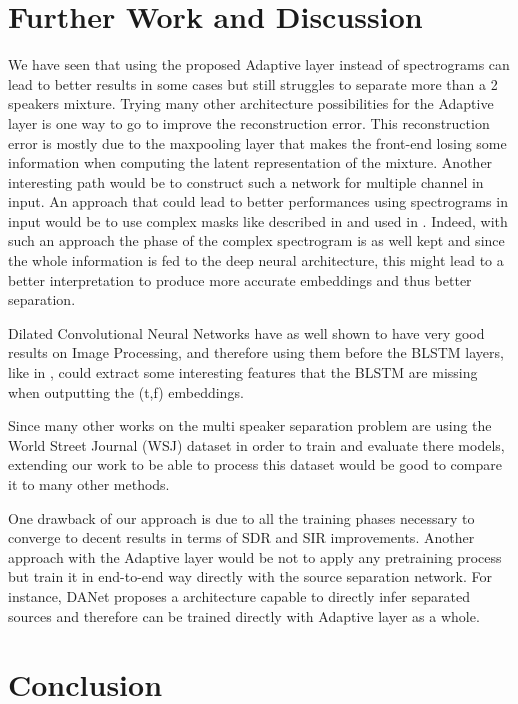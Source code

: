 \documentclass[master,final,11pt]{iscs-thesis}
\begin{document}
\chapter{Further Work and Discussion}

We have seen that using the proposed Adaptive layer instead of spectrograms can lead to better results in some cases but still struggles to separate more than a 2 speakers mixture. Trying many other architecture possibilities for the Adaptive layer is one way to go to improve the reconstruction error. This reconstruction error is mostly due to the maxpooling layer that makes the front-end losing some information when computing the latent representation of the mixture.
Another interesting path would be to construct such a network for multiple channel in input.
An approach that could lead to better performances using spectrograms in input would be to use complex masks like described in \cite{OverviewSSDL} and used in \cite{ImageSS}. Indeed, with such an approach the phase of the complex spectrogram is as well kept and since the whole information is fed to the deep neural architecture, this might lead to a better interpretation to produce more accurate embeddings and thus better separation.

Dilated Convolutional Neural Networks have as well shown to have very good results on Image Processing, and therefore using them before the BLSTM layers, like in \cite{ImageSS}, could extract some interesting features that the BLSTM are missing when outputting the (t,f) embeddings.

Since many other works on the multi speaker separation problem are using the World Street Journal (WSJ) dataset in order to train and evaluate there models, extending our work to be able to process this dataset would be good to compare it to many other methods.

One drawback of our approach is due to all the training phases necessary to converge to decent results in terms of SDR and SIR improvements. Another approach with the Adaptive layer would be not to apply any pretraining process but train it in end-to-end way directly with the source separation network. For instance, DANet \cite{DANet} proposes a architecture capable to directly infer separated sources and therefore can be trained directly with Adaptive layer as a whole.

\chapter{Conclusion}
\end{document}
